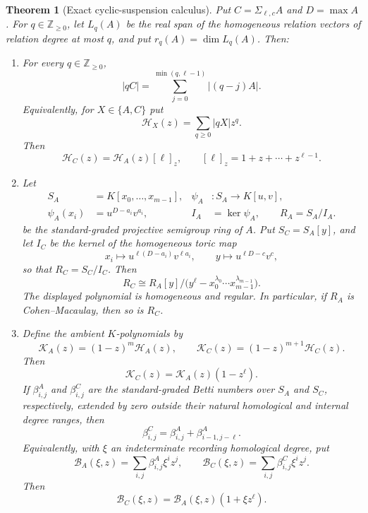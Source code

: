 \documentclass[11pt,reqno]{amsart}
\newtheorem{theorem}{Theorem}[section]
\theoremstyle{definition}
\theoremstyle{remark}
\begin{document}
\begin{theorem}[Exact cyclic-suspension calculus]
\label{thm:cyclic-suspension}
Put $C=\Sigma_{\ell,c}A$ and $D=\max A$.  For
$q\in\mathbb Z_{\geq0}$, let $L_q(A)$ be the real span of the homogeneous
relation vectors of relation degree at most $q$, and put
$r_q(A)=\dim L_q(A)$.  Then:
\begin{enumerate}[label=\textup{(\roman*)}]
\item For every $q\in\mathbb Z_{\geq0}$,
\begin{equation}\label{eq:suspension-profile}
 |qC|=\sum_{j=0}^{\min(q,\ell-1)}|(q-j)A|.
\end{equation}
Equivalently, for $X\in\{A,C\}$ put
\[
 \mathcal H_X(z)=\sum_{q\geq0}|qX|z^q.
\]
Then
\begin{equation}\label{eq:suspension-Hilbert-series}
 \mathcal H_C(z)=\mathcal H_A(z)[\ell]_z,\qquad
 [\ell]_z=1+z+\cdots+z^{\ell-1}.
\end{equation}

\item Let
\[
 \begin{aligned}
 S_A&=K[x_0,\ldots,x_{m-1}],&
 \psi_A&:S_A\longrightarrow K[u,v],\\
 \psi_A(x_i)&=u^{D-a_i}v^{a_i},&
 I_A&=\ker\psi_A,\qquad R_A=S_A/I_A.
 \end{aligned}
\]
be the standard-graded projective semigroup ring of $A$.  Put
$S_C=S_A[y]$, and let $I_C$ be the kernel of the homogeneous toric map
\[
 x_i\longmapsto u^{\ell(D-a_i)}v^{\ell a_i},\qquad
 y\longmapsto u^{\ell D-c}v^c,
\]
so that $R_C=S_C/I_C$.  Then
\begin{equation}\label{eq:suspension-toric}
 R_C\cong
 R_A[y]\big/\bigl(y^\ell-x_0^{\lambda_0}\cdots
 x_{m-1}^{\lambda_{m-1}}\bigr).
\end{equation}
The displayed polynomial is homogeneous and regular.  In particular, if
$R_A$ is Cohen--Macaulay, then so is $R_C$.

\item Define the ambient $K$-polynomials by
\[
 \mathcal K_A(z)=(1-z)^m\mathcal H_A(z),\qquad
 \mathcal K_C(z)=(1-z)^{m+1}\mathcal H_C(z).
\]
Then
\begin{equation}\label{eq:suspension-K}
 \mathcal K_C(z)=\mathcal K_A(z)(1-z^\ell).
\end{equation}
If $\beta^A_{i,j}$ and $\beta^C_{i,j}$ are the standard-graded Betti
numbers over $S_A$ and $S_C$, respectively, extended by zero outside their
natural homological and internal degree ranges, then
\begin{equation}\label{eq:suspension-Betti}
 \beta^C_{i,j}
 =\beta^A_{i,j}+\beta^A_{i-1,j-\ell}.
\end{equation}
Equivalently, with $\xi$ an indeterminate recording homological degree, put
\[
 \mathcal B_A(\xi,z)=\sum_{i,j}\beta^A_{i,j}\xi^iz^j,
 \qquad
 \mathcal B_C(\xi,z)=\sum_{i,j}\beta^C_{i,j}\xi^iz^j.
\]
Then
\[
 \mathcal B_C(\xi,z)=\mathcal B_A(\xi,z)(1+\xi z^\ell).
\]


\end{enumerate}
\end{theorem}
\end{document}
